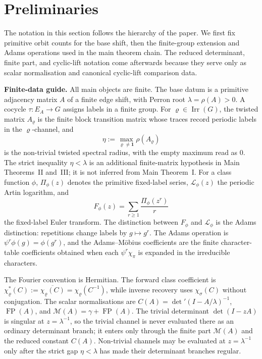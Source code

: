 \documentclass[11pt,a4paper]{amsart}
\theoremstyle{plain}
\theoremstyle{definition}
\theoremstyle{remark}
\DeclareMathOperator{\Irr}{Irr}
\DeclareMathOperator{\FP}{FP}
\begin{document}
\section{Preliminaries}\label{sec:preliminaries}

The notation in this section follows the hierarchy of the paper. We
first fix primitive orbit counts for the base shift, then the
finite-group extension and Adams operations used in the main theorem
chain. The reduced determinant, finite part, and cyclic-lift notation
come afterwards because they serve only as scalar normalisation and
canonical cyclic-lift comparison data.

\medskip
\noindent\textbf{Finite-data guide.}
All main objects are finite.  The base datum is a primitive adjacency
matrix \(A\) of a finite edge shift, with Perron root
\(\lambda=\rho(A)>0\).  A cocycle \(\tau:E_A\to G\) assigns labels in a
finite group.  For \(\varrho\in\Irr(G)\), the twisted matrix
\(A_\varrho\) is the finite block transition matrix whose traces record
periodic labels in the \(\varrho\)-channel, and
\[
  \eta:=\max_{\varrho\ne\mathbf1}\rho(A_\varrho)
\]
is the non-trivial twisted spectral radius, with the empty maximum read
as \(0\).  The strict inequality \(\eta<\lambda\) is an additional
finite-matrix hypothesis in Main Theorems~II and~III; it is not inferred
from Main Theorem~I.  For a class function \(\phi\),
\(\Pi_\phi(z)\) denotes the primitive fixed-label series,
\(\mathcal L_\phi(z)\) the periodic Artin logarithm, and
\[
  F_\phi(z)=\sum_{r\ge1}\frac{\Pi_\phi(z^r)}{r}
\]
the fixed-label Euler transform.  The distinction between
\(F_\phi\) and \(\mathcal L_\phi\) is the Adams distinction: repetitions
change labels by \(g\mapsto g^r\).  The Adams operation is
\(\psi^r\phi(g)=\phi(g^r)\), and the Adams--M\"obius coefficients are the
finite character-table coefficients obtained when each
\(\psi^r\chi_\pi\) is expanded in the irreducible characters.

The Fourier convention is Hermitian.  The forward class coefficient is
\(\chi_\varrho^\ast(C):=\overline{\chi_\varrho(C)}
=\chi_\varrho(C^{-1})\), while inverse recovery uses
\(\chi_\sigma(C)\) without conjugation.  The scalar normalisations are
\(C(A)=\det'(I-A/\lambda)^{-1}\),
\(\FP(A)\), and \(\mathcal M(A)=\gamma+\FP(A)\).  The trivial determinant
\(\det(I-zA)\) is singular at \(z=\lambda^{-1}\), so the trivial channel
is never evaluated there as an ordinary determinant branch; it enters
only through the finite part \(\mathcal M(A)\) and the reduced constant
\(C(A)\).  Non-trivial channels may be evaluated at
\(z=\lambda^{-1}\) only after the strict gap \(\eta<\lambda\) has made
their determinant branches regular.
\end{document}
